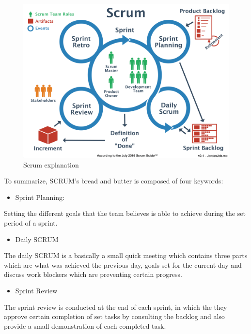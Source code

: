 \documentclass[]{report}
\begin{document}
\begin{figure}[H]
	\begin{center}
	\includegraphics[width=150mm, frame]{scrum.png}
	\caption{Scrum explanation}
\end{center}
\end{figure}


To summarize, SCRUM’s bread and butter is composed of four keywords:
\begin{itemize}
	\item Sprint Planning:
\end{itemize}

Setting the different goals that the team believes is able to achieve during the set
period of a sprint.

\begin{itemize}
	\item Daily SCRUM
\end{itemize}

The daily SCRUM is a basically a small quick meeting which contains three
parts which are what was achieved the previous day, goals set for the current
day and discuss work blockers which are preventing certain progress.

\begin{itemize}
	\item Sprint Review
\end{itemize}

The sprint review is conducted at the end of each sprint, in which the they
approve certain completion of set tasks by consulting the backlog and also
provide a small demonstration of each completed task.
\end{document}
